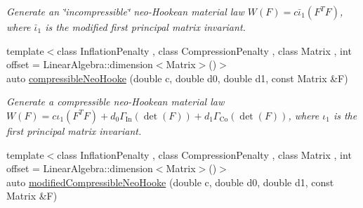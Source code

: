 \begin{DoxyCompactItemize}
\begin{DoxyCompactList}\small\item\em Generate an \char`\"{}incompressible\char`\"{} neo-\/\-Hookean material law $ W(F)=c\bar\iota_1(F^T F) $, where $\bar\iota_1$ is the modified first principal matrix invariant. \end{DoxyCompactList}\item 
\hypertarget{group__Rubber_ga35a60a5ae50481becd543140ba82c171}{{\footnotesize template$<$class Inflation\-Penalty , class Compression\-Penalty , class Matrix , int offset = Linear\-Algebra\-::dimension$<$\-Matrix$>$()$>$ }\\auto \hyperlink{group__Rubber_ga35a60a5ae50481becd543140ba82c171}{compressible\-Neo\-Hooke} (double c, double d0, double d1, const Matrix \&F)}\label{group__Rubber_ga35a60a5ae50481becd543140ba82c171}

\begin{DoxyCompactList}\small\item\em Generate a compressible neo-\/\-Hookean material law $ W(F)=c\iota_1(F^T F)+d_0\Gamma_\mathrm{In}(\det(F))+d_1\Gamma_\mathrm{Co}(\det(F)) $, where $\iota_1$ is the first principal matrix invariant. \end{DoxyCompactList}\item 
\hypertarget{group__Rubber_gad4985bcfe7726155b3b53f94094ebb3e}{{\footnotesize template$<$class Inflation\-Penalty , class Compression\-Penalty , class Matrix , int offset = Linear\-Algebra\-::dimension$<$\-Matrix$>$()$>$ }\\auto \hyperlink{group__Rubber_gad4985bcfe7726155b3b53f94094ebb3e}{modified\-Compressible\-Neo\-Hooke} (double c, double d0, double d1, const Matrix \&F)}\label{group__Rubber_gad4985bcfe7726155b3b53f94094ebb3e}


\end{DoxyCompactItemize}
